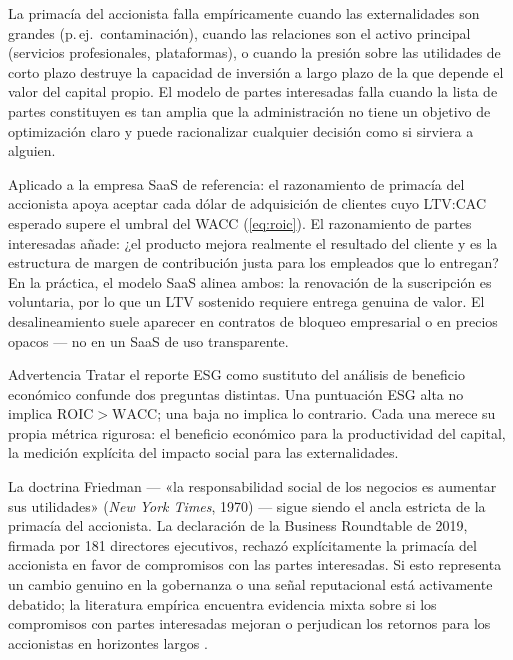 La primacía del accionista falla empíricamente cuando las externalidades son grandes (p.\,ej.\
contaminación), cuando las relaciones son el activo principal (servicios profesionales,
plataformas), o cuando la presión sobre las utilidades de corto plazo destruye la capacidad de
inversión a largo plazo de la que depende el valor del capital propio. El modelo de partes
interesadas falla cuando la lista de partes constituyen es tan amplia que la administración no
tiene un objetivo de optimización claro y puede racionalizar cualquier decisión como si sirviera
a alguien.

\begin{example}
Aplicado a la empresa SaaS de referencia: el razonamiento de primacía del accionista apoya
aceptar cada dólar de adquisición de clientes cuyo LTV:CAC esperado supere el umbral del WACC
(\cref{eq:roic}). El razonamiento de partes interesadas añade: ¿el producto mejora realmente el
resultado del cliente y es la estructura de margen de contribución justa para los empleados que
lo entregan? En la práctica, el modelo SaaS alinea ambos: la renovación de la suscripción es
voluntaria, por lo que un LTV sostenido requiere entrega genuina de valor. El desalineamiento
suele aparecer en contratos de bloqueo empresarial o en precios opacos --- no en un SaaS de uso
transparente.
\end{example}

\begin{admonition}{Advertencia}
Tratar el reporte ESG como sustituto del análisis de beneficio económico confunde dos preguntas
distintas. Una puntuación ESG alta no implica \(\mathrm{ROIC}>\mathrm{WACC}\); una baja no
implica lo contrario. Cada una merece su propia métrica rigurosa: el beneficio económico para la
productividad del capital, la medición explícita del impacto social para las externalidades.
\end{admonition}

La doctrina Friedman --- «la responsabilidad social de los negocios es aumentar sus utilidades»
(\emph{New York Times}, 1970) --- sigue siendo el ancla estricta de la primacía del accionista.
La declaración de la Business Roundtable de 2019, firmada por 181 directores ejecutivos, rechazó
explícitamente la primacía del accionista en favor de compromisos con las partes interesadas. Si
esto representa un cambio genuino en la gobernanza o una señal reputacional está activamente
debatido; la literatura empírica encuentra evidencia mixta sobre si los compromisos con partes
interesadas mejoran o perjudican los retornos para los accionistas en horizontes largos
\parencite{kotler2021}.

